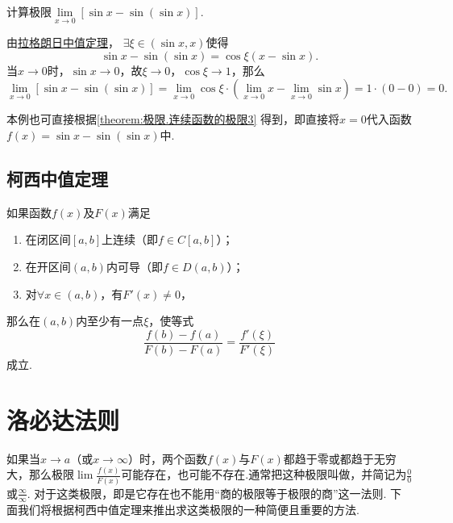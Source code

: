 \begin{example}
\def\l{\lim\limits_{x\to0}}%
计算极限\(\l \left[\sin x - \sin(\sin x)\right]\).
\begin{solution}
由\hyperref[theorem:微分中值定理.拉格朗日中值定理]{拉格朗日中值定理}，
\(\exists\xi\in(\sin x,x)\)使得\[
\sin x - \sin(\sin x)
= \cos\xi (x-\sin x).
\]当\(x\to0\)时，\(\sin x\to0\)，故\(\xi\to0\)，\(\cos\xi\to1\)，那么\[
\l \left[\sin x - \sin(\sin x)\right]
= \l \cos\xi \cdot \left(\l x - \l \sin x\right)
= 1 \cdot (0-0) = 0.
\]
\end{solution}
\end{example}
本例也可直接根据\cref{theorem:极限.连续函数的极限3} 得到，即直接将\(x=0\)代入函数\(f(x) = \sin x - \sin(\sin x)\)中.

\subsection{柯西中值定理}
\begin{theorem}[柯西中值定理]\label{theorem:微分中值定理.柯西中值定理}
如果函数\(f(x)\)及\(F(x)\)满足
\begin{enumerate}
\item 在闭区间\([a,b]\)上连续（即\(f \in C[a,b]\)）；
\item 在开区间\((a,b)\)内可导（即\(f \in D(a,b)\)）；
\item 对\(\forall x\in(a,b)\)，有\(F'(x) \neq 0\)，
\end{enumerate}
那么在\((a,b)\)内至少有一点\(\xi\)，使等式
\begin{equation}
\frac{f(b)-f(a)}{F(b)-F(a)}=\frac{f'(\xi)}{F'(\xi)}
\end{equation}
成立.
\end{theorem}

\section{洛必达法则}
如果当\(x \to a\)（或\(x \to \infty\)）时，两个函数\(f(x)\)与\(F(x)\)都趋于零或都趋于无穷大，那么极限\(\lim\frac{f(x)}{F(x)}\)可能存在，也可能不存在.通常把这种极限叫做，并简记为\(\frac{0}{0}\)或\(\frac{\infty}{\infty}\).
对于这类极限，即是它存在也不能用“商的极限等于极限的商”这一法则.
下面我们将根据柯西中值定理来推出求这类极限的一种简便且重要的方法.

